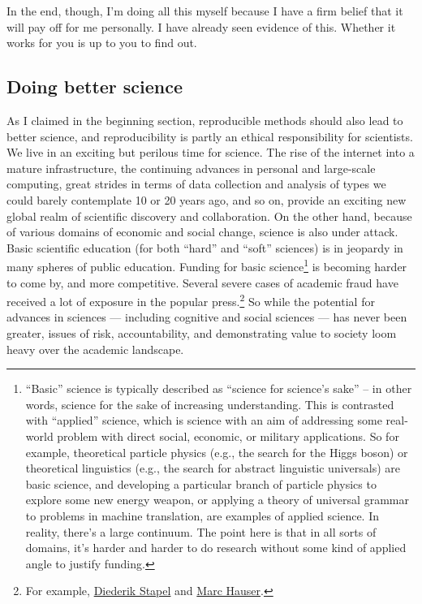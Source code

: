 \documentclass{book}
\begin{document}
In the end, though, I'm doing all this myself because I have a firm belief that it will pay off for me personally.  I have already seen evidence of this. Whether it works for you is up to you to find out.
\subsection{Doing better science}
\label{sec-2-3-2}

As I claimed in the beginning section, reproducible methods should also lead to better science, and reproducibility is partly an ethical responsibility for scientists. We live in an exciting but perilous time for science. The rise of the internet into a mature infrastructure, the continuing advances in personal and large-scale computing, great strides in terms of data collection and analysis of types we could barely contemplate 10 or 20 years ago, and so on, provide an exciting new global realm of scientific discovery and collaboration. On the other hand, because of various domains of economic and social change, science is also under attack.  Basic scientific education (for both ``hard'' and ``soft'' sciences) is in jeopardy in many spheres of public education.  Funding for basic science\footnote{``Basic'' science is typically described as ``science for science's sake'' -- in other words, science for the sake of increasing understanding. This is contrasted with ``applied'' science, which is science with an aim of addressing some real-world problem with direct social, economic, or military applications. So for example, theoretical particle physics (e.g., the search for the Higgs boson) or theoretical linguistics (e.g., the search for abstract linguistic universals) are basic science, and developing a particular branch of particle physics to explore some new energy weapon, or applying a theory of universal grammar to problems in machine translation, are examples of applied science. In reality, there's a large continuum. The point here is that in all sorts of domains, it's harder and harder to do research without some kind of applied angle to justify funding.
 } is becoming harder to come by, and more competitive.  Several severe cases of academic fraud have received a lot of exposure in the popular press.\footnote{For example, \href{http://www.nytimes.com/2013/04/28/magazine/diederik-stapels-audacious-academic-fraud.html}{Diederik Stapel} and \href{http://www.boston.com/whitecoatnotes/2012/09/05/harvard-professor-who-resigned-fabricated-manipulated-data-says/UvCmT8yCcmydpDoEkIRhGP/story.html}{Marc Hauser}.
 } So while the potential for advances in sciences --- including cognitive and social sciences --- has never been greater, issues of risk, accountability, and demonstrating value to society loom heavy over the academic landscape.
\end{document}
